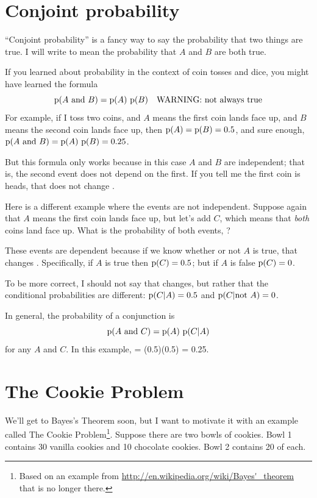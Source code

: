 \documentclass[12pt]{book}
\begin{document}
\section{Conjoint probability}

``Conjoint probability'' is a fancy way to say the probability that
two things are true.  I will write  to mean the
probability that $A$ and $B$ are both true.

If you learned about probability in the context of coin tosses and
dice, you might have learned the formula
%
\[ \mathrm{p}(A ~\mathrm{and}~ B) = \mathrm{p}(A)~\mathrm{p}(B) \quad\mbox{WARNING: not always true}\]
%
For example, if I toss two coins, and $A$ means the first coin lands
face up, and $B$ means the second coin lands face up, then $\mathrm{p}(A) =
\mathrm{p}(B) = 0.5$, and sure enough, $\mathrm{p}(A ~\mathrm{and}~ B) = \mathrm{p}(A)~\mathrm{p}(B) = 0.25$.

But this formula only works because in this case $A$ and $B$ are
independent; that is, the second event does not depend on the first.
If you tell me the first coin is heads, that does not change .

Here is a different example where the events are not independent.
Suppose again that $A$ means the first coin lands face up, but let's
add $C$, which means that {\em both} coins land face up.  What is the
probability of both events, ?

These events are dependent because if we know whether or not $A$ is
true, that changes .  Specifically, if $A$ is true then $\mathrm{p}(C)
= 0.5$; but if $A$ is false $\mathrm{p}(C) = 0$.

To be more correct, I should not say that  changes, but
rather that the conditional probabilities are different: $\mathrm{p}(C|A) = 0.5$
and $\mathrm{p}(C| \mathrm{not}~ A) = 0$.

In general, the probability of a conjunction is
%
\[ \mathrm{p}(A ~\mathrm{and}~ C) = \mathrm{p}(A)~\mathrm{p}(C|A) \]
%
for any $A$ and $C$.  In this example,  = (0.5)(0.5) = 0.25.


\section{The Cookie Problem}

We'll get to Bayes's Theorem soon, but I want to motivate it with an
example called The Cookie Problem\footnote{Based on an example from
  \url{http://en.wikipedia.org/wiki/Bayes'_theorem} that is no longer
  there.}.  Suppose there are two bowls of cookies.  Bowl 1 contains
  30 vanilla cookies and 10 chocolate cookies.  Bowl 2 contains 20 of
  each.
\end{document}
